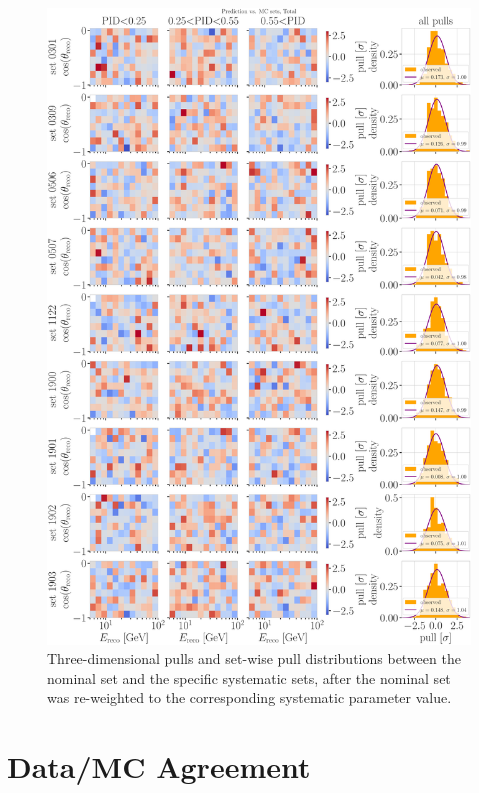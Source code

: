 \begin{figure}[h]
    \includegraphics{figures/results/utlrasurfaces/oscNext_leptoninjector_1.0_GeV_knn_probs_neighbors_500_weighted_nfiles_extended_holeice_corrected_grads_poly_2_weighted_reference_weight_0.0100_thesis_style_subset_1-5.png}
    \caption[Detector systematic uncertainty treatment bin-wise pulls additional sets]{Three-dimensional pulls and set-wise pull distributions between the nominal set and the specific systematic sets, after the nominal set was re-weighted to the corresponding systematic parameter value.}
\end{figure}


\section{Data/MC Agreement} 

